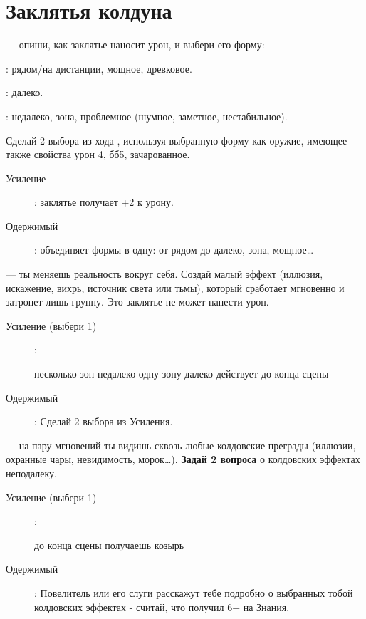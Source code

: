 \documentclass[10pt,twoside]{report}
\begin{document}
\section*{Заклятья колдуна}
\begin{description}[noitemsep]
\item[Слово Смерти]--- опиши, как заклятье наносит урон, и выбери его
  форму:
  \begin{description}[noitemsep]
\item[Коготь]: рядом/на дистанции, мощное, древковое.
\item[Стрела]: далеко.
\item[Вспышка]: недалеко, зона, проблемное (шумное, заметное, нестабильное).
\end{description}
Сделай 2 выбора из хода {}, используя выбранную
форму как оружие, имеющее также свойства урон 4, бб5, зачарованное.
\begin{description}
\item[Усиление]: заклятье получает +2 к урону.
 \item[Одержимый]: объединяет формы в одну: от рядом до далеко, зона,
    мощное\ldots
\end{description}
\vfill  

\item[Слово Искажения]--- ты меняешь реальность вокруг себя. Создай малый
эффект (иллюзия, искажение, вихрь, источник света или тьмы), который
сработает мгновенно и затронет лишь группу. Это заклятье не может
нанести урон.
\begin{description}
\item[Усиление (выбери 1)]:
  \begin{itemize}
   несколько зон недалеко
   одну зону далеко
     действует до конца сцены 
  \end{itemize}
 \item[Одержимый]: Сделай 2 выбора из Усиления.
 \end{description}
\vfill
\pagebreak

 \item[Взгляд Бездны]--- на пару мгновений ты видишь сквозь любые
  колдовские преграды (иллюзии, охранные чары, невидимость, морок\ldots). {\bfseries Задай 2 вопроса} о колдовских эффектах неподалеку.
  \begin{description}
  \item[Усиление (выбери 1)]:
    \begin{itemize}
     до конца сцены
       получаешь козырь
    \end{itemize}
  \item[Одержимый]: Повелитель или его слуги расскажут тебе подробно о выбранных тобой колдовских эффектах - считай, что получил 6+ на Знания.
  \end{description}
  \vfill



\end{description}
\end{document}
